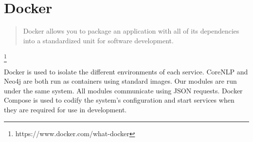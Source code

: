   \tocless\section{Docker}
    \blockquote{Docker allows you to package an application with all of its dependencies into a standardized unit for software development.}\footnote{https://www.docker.com/what-docker}

    Docker is used to isolate the different environments of each service. CoreNLP and Neo4j are both run as containers using standard images. Our modules are run under the same system. All modules communicate using JSON requests. Docker Compose is used to codify the system's configuration and start services when they are required for use in development.
